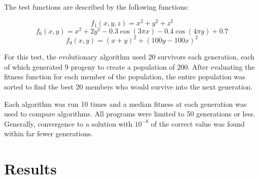 \documentclass[12pt, titlepage]{article}
\begin{document}
The test functions are described by the following functions:

\begin{displaymath}
f_1(x,y,z) = x^2 + y^2 + z^2
\end{displaymath}
\begin{displaymath}
f_6(x,y) = x^2 + 2 y^2 - 0.3 \cos(3 \pi x) - 0.4 \cos(4 \pi y) + 0.7
\end{displaymath}
\begin{displaymath}
f_9(x,y) = (x+y)^2 + (100 y - 100 x)^2
\end{displaymath}

For this test, the evolutionary algorithm used 20 survivors each
generation, each of which generated 9 progeny to create a population
of 200.  After evaluating the fitness function for each member of the
population, the entire population was sorted to find the best 20
members who would survive into the next generation.  

Each algorithm was run 10 times and a median fitness at each
generation was used to compare algorithms.  All programs were limited
to 50 generations or less.  Generally, convergence to a solution with
$10^{-8}$ of the correct value was found within far fewer generations.

\section{Results}
\end{document}
